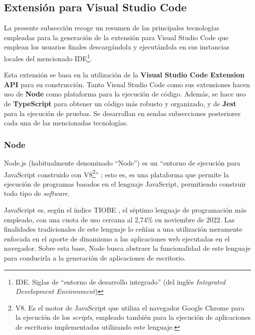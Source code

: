\subsection{Extensión para Visual Studio Code}
\label{subsec:tecCliente}
La presente subsección recoge un resumen de las principales tecnologías empleadas para la generación de la extensión para Visual Studio Code que emplean los usuarios finales descargándola y ejecutándola en sus instancias locales del mencionado IDE\footnote{IDE. Siglas de ``entorno de desarrollo integrado'' (del inglés \textit{Integrated Development Environment})}.

Esta extensión se basa en la utilización de la \textbf{Visual Studio Code Extension API} para su construcción. Tanto Visual Studio Code como sus extensiones hacen uso de \textbf{Node} como plataforma para la ejecución de código. Además, se hace uso de \textbf{TypeScript} para obtener un código más robusto y organizado, y de \textbf{Jest} para la ejecución de pruebas. Se desarrollan en sendas subsecciones posteriores cada una de las mencionadas tecnologías.

\subsubsection{Node}
Node.js (habitualmente denominado ``Node'') es un ``entorno de ejecución para JavaScript construido con V8\footnote{V8. Es el motor de JavaScript que utiliza el navegador Google Chrome para la ejecución de los \textit{scripts}, empleado también para la ejecución de aplicaciones de escritorio implementadas utilizando este lenguaje.}'' \cite{Tec_Node}; esto es, es una plataforma que permite la ejecución de programas basados en el lenguaje JavaScript, permitiendo construir todo tipo de \textit{software}.

JavaScript es, según el índice TIOBE \cite{TIOBE}, el séptimo lenguaje de programación más empleado, con una cuota de uso cercana al 2,74\% en noviembre de 2022. Las finalidades tradicionales de este lenguaje lo ceñían a una utilización meramente enfocada en el aporte de dinamismo a las aplicaciones web ejecutadas en el navegador. Sobre esta base, Node busca abstraer la funcionalidad de este lenguaje para conducirla a la generación de aplicaciones de escritorio.

